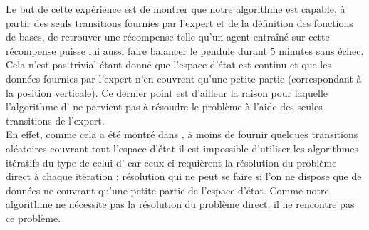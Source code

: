 \documentclass[publibook-draft]{CAp2012}
\begin{document}
{Le but de cette expérience est de montrer que notre algorithme est capable, à partir des seuls transitions fournies par l'expert et de la définition des fonctions de bases, de retrouver une récompense telle qu'un agent entraîné sur cette récompense puisse lui aussi faire balancer le pendule durant 5 minutes sans échec. Cela n'est pas trivial étant donné que l'espace d'état est continu et que les données fournies par l'expert n'en couvrent qu'une petite partie (correspondant à la position verticale). Ce dernier point est d'ailleur la raison pour laquelle l'algorithme d'\citet{abbeel2004apprenticeship} ne parvient pas à résoudre le problème à l'aide des seules transitions de l'expert.\\

En effet, comme cela a été montré dans \citep{klein2011batch}, à moins de fournir quelques transitions aléatoires couvrant tout l'espace d'état il est impossible d'utiliser les algorithmes itératifs du type de celui d'\citet{abbeel2004apprenticeship} car ceux-ci requièrent la résolution du problème direct à chaque itération ; résolution qui ne peut se faire si l'on ne dispose que de données ne couvrant qu'une petite partie de l'espace d'état. Comme notre algorithme ne nécessite pas la résolution du problème direct, il ne rencontre pas ce problème.
}
\end{document}
